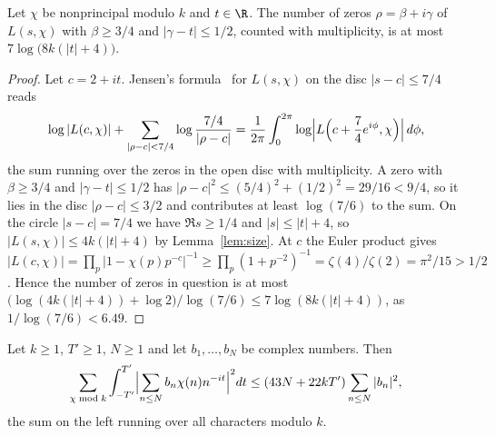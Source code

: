 \begin{lemma}\label{lem:zerobox}
Let $\chi$ be nonprincipal modulo $k$ and $t\in\R$. The number of zeros $\rho=\beta+i\gamma$ of $L(s,\chi)$ with $\beta\ge3/4$ and $|\gamma-t|\le1/2$, counted with multiplicity, is at most $7\log\bigl(8k(|t|+4)\bigr)$.
\end{lemma}

\begin{proof}
Let $c=2+it$. Jensen's formula~\cite[Theorem~15.18]{Rud87} for $L(s,\chi)$ on the disc $|s-c|\le7/4$ reads
\[
  \log|L(c,\chi)|+\sum_{|\rho-c|<7/4}\log\frac{7/4}{|\rho-c|}=\frac1{2\pi}\int_0^{2\pi}\log\Bigl|L\Bigl(c+\frac74e^{i\phi},\chi\Bigr)\Bigr|\,d\phi,
\]
the sum running over the zeros in the open disc with multiplicity. A zero with $\beta\ge3/4$ and $|\gamma-t|\le1/2$ has $|\rho-c|^2\le(5/4)^2+(1/2)^2=29/16<9/4$, so it lies in the disc $|\rho-c|\le3/2$ and contributes at least $\log(7/6)$ to the sum. On the circle $|s-c|=7/4$ we have $\Re s\ge1/4$ and $|s|\le|t|+4$, so $|L(s,\chi)|\le4k(|t|+4)$ by Lemma~\ref{lem:size}. At $c$ the Euler product gives $|L(c,\chi)|=\prod_p|1-\chi(p)p^{-c}|^{-1}\ge\prod_p(1+p^{-2})^{-1}=\zeta(4)/\zeta(2)=\pi^2/15>1/2$. Hence the number of zeros in question is at most
$\bigl(\log(4k(|t|+4))+\log2\bigr)/\log(7/6)\le7\log(8k(|t|+4))$, as $1/\log(7/6)<6.49$.
\end{proof}

\begin{lemma}\label{lem:hybrid}
Let $k\ge1$, $T'\ge1$, $N\ge1$ and let $b_1,\dots,b_N$ be complex numbers. Then
\[
  \sum_{\chi\bmod k}\int_{-T'}^{T'}\Bigl|\sum_{n\le N}b_n\chi(n)n^{-it}\Bigr|^2dt\le(43N+22kT')\sum_{n\le N}|b_n|^2,
\]
the sum on the left running over all characters modulo $k$.
\end{lemma}

